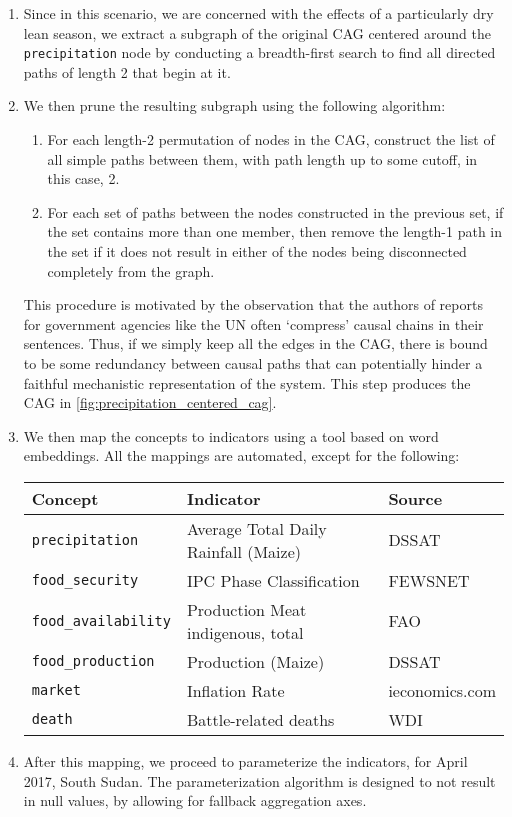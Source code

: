 \documentclass{apnotes}
\begin{document}
\begin{enumerate}
\item Since in this scenario, we are concerned with the effects of a
  particularly dry lean season, we extract a subgraph of the original CAG
  centered around the \texttt{precipitation} node by conducting a
  breadth-first search to find all directed paths of length 2 that begin at it.

\item We then prune the resulting subgraph using the following algorithm:
  \begin{enumerate}
    \item For each length-2 permutation of nodes in the CAG, construct the list
      of all simple paths between them, with path length up to some cutoff, in
      this case, 2.
    \item For each set of paths between the nodes constructed in the previous
      set, if the set contains more than one member, then remove the length-1
      path in the set if it does not result in either of the nodes being
      disconnected completely from the graph.
  \end{enumerate}

  This procedure is motivated by the observation that the authors of reports 
  for government agencies like the UN often `compress' causal chains in their
  sentences. Thus, if we simply keep all the edges in the CAG, there is bound to
  be some redundancy between causal paths that can potentially hinder a faithful
  mechanistic representation of the system. This step produces the CAG in
  \autoref{fig:precipitation_centered_cag}.

\item We then map the concepts to indicators using a tool based on word
  embeddings. All the mappings are automated, except for the following:
  
  \bigskip

  {\centering
  \begin{tabular}{lll}
    \toprule
    Concept                     & Indicator                            & Source\\
    \midrule
    \texttt{precipitation}      & Average Total Daily Rainfall (Maize) & DSSAT\\
    \texttt{food\_security}     & IPC Phase Classification             & FEWSNET\\
    \texttt{food\_availability} & Production Meat indigenous, total    & FAO\\
    \texttt{food\_production}   & Production (Maize)                   & DSSAT\\
    \texttt{market}             & Inflation Rate                       & ieconomics.com\\
    \texttt{death}              & Battle-related deaths                & WDI\\
    \bottomrule
  \end{tabular}
  }

\item After this mapping, we proceed to parameterize the indicators, for April
  2017, South Sudan. The parameterization algorithm is designed to not result in
  null values, by allowing for fallback aggregation axes.
\end{enumerate}
\end{document}
